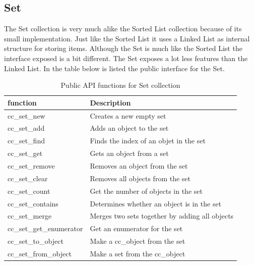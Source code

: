 \documentclass[table]{ituthesis}
\begin{document}
	\subsection{Set}
	
	The Set collection is very much alike the Sorted List collection because of its small implementation. Just like the Sorted List it uses a Linked List as internal structure for storing items. Although the Set is much like the Sorted List the interface exposed is a bit different. The Set exposes a lot less features than the Linked List. In the table below is listed the public interface for the Set.
	
	\begin{table}[ht]
		\begin{center}
	    \begin{tabular}{| l | l |}
			\hline
			\rowcolor{gray!50}
			\textbf{function}				&		\textbf{Description}															\\ \hline
		    cc\_set\_new            	& Creates a new empty set                         \\ \hline
		    cc\_set\_add            	& Adds an object to the set                       \\ \hline
		    cc\_set\_find           	& Finds the index of an objet in the set          \\ \hline
		    cc\_set\_get            	& Gets an object from a set                       \\ \hline
		    cc\_set\_remove         	& Removes an object from the set                  \\ \hline
		    cc\_set\_clear          	& Removes all objects from the set                \\ \hline
		    cc\_set\_count          	& Get the number of objects in the set            \\ \hline
		    cc\_set\_contains       	& Determines whether an object is in the set      \\ \hline
		    cc\_set\_merge          	& Merges two sets together by adding all objects  \\ \hline
		    cc\_set\_get\_enumerator	& Get an enumerator for the set                   \\ \hline
		    cc\_set\_to\_object     	& Make a cc\_object from the set                  \\ \hline
		    cc\_set\_from\_object   	& Make a set from the cc\_object                  \\ \hline
	    \end{tabular}
			\caption{Public API functions for Set collection}
		\end{center}
	\end{table}
	
\end{document}
